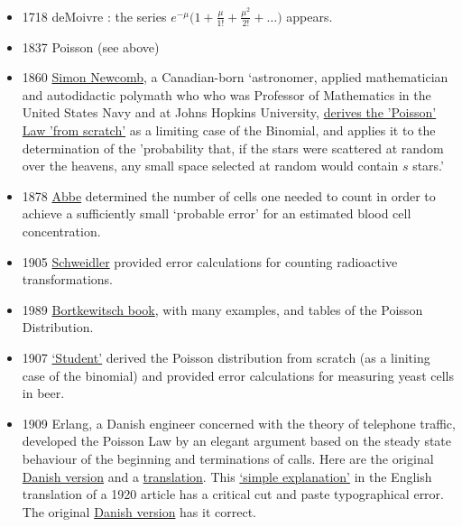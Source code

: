 \documentclass[]{book}
\providecommand{\tightlist}{%
  \setlength{\itemsep}{0pt}\setlength{\parskip}{0pt}}
\begin{document}
\begin{itemize}
\tightlist
\item
  1718 deMoivre : the series \(e^{-\mu} \bigg(1 + \frac{\mu}{1!} + \frac{\mu^2}{2!} + \dots \bigg)\) appears.
\item
  1837 Poisson (see above)
\item
  1860 \href{https://en.wikipedia.org/wiki/Simon_Newcomb}{Simon Newcomb}, a Canadian-born `astronomer, applied mathematician and autodidactic polymath who who was Professor of Mathematics in the United States Navy and at Johns Hopkins University, \href{http://www.epi.mcgill.ca/hanley/statbook/Newcomb1860.pdf}{derives the 'Poisson' Law 'from scratch'} as a limiting case of the Binomial, and applies it to the determination of the 'probability that, if the stars were scattered at random over the heavens, any small space selected at random would contain \(s\) stars.'
\item
  1878 \href{http://www.biostat.mcgill.ca/hanley/statbook/Abbe1878.pdf}{Abbe} determined the number of cells one needed to count in order to achieve a sufficiently small `probable error' for an estimated blood cell concentration.
\item
  1905 \href{http://www.biostat.mcgill.ca/hanley/statbook/SchweidlerPremiercongres1905.pdf}{Schweidler} provided error calculations for counting radioactive transformations.
\item
  1989 \href{http://www.biostat.mcgill.ca/hanley/statbook/dasGesetzDerKeinemZaklenBortkiewicz.pdf}{Bortkewitsch book}, with many examples, and tables of the Poisson Distribution.
\item
  1907 \href{http://www.medicine.mcgill.ca/epidemiology/hanley/bios601/Intensity-Rate/Student_counting.pdf}{`Student'} derived the Poisson distribution from scratch (as a liniting case of the binomial) and provided error calculations for measuring yeast cells in beer.
\item
  1909 Erlang, a Danish engineer concerned with the theory of telephone traffic, developed the Poisson Law by an elegant argument based on the steady state behaviour of the beginning and terminations of calls.
  Here are the original \href{http://www.medicine.mcgill.ca/epidemiology/hanley/statbook/ErlangInDanish1909.pdf}{Danish version} and a \href{http://www.medicine.mcgill.ca/epidemiology/hanley/statbook/Erlang1909.pdf}{translation}. This \href{http://www.medicine.mcgill.ca/epidemiology/hanley/statbook/ErlangSimpleProofPoisson.pdf\#page=14}{`simple explanation'} in the English translation of a 1920 article has a critical cut and paste typographical error. The original \href{http://www.medicine.mcgill.ca/epidemiology/hanley/statbook/38MatematiskTidsskrift1920.pdf}{Danish version} has it correct.

\end{itemize}
\end{document}

